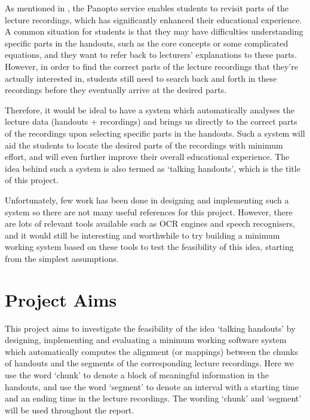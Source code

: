 As mentioned in , the Panopto service enables students to revisit parts of the lecture recordings, which has significantly enhanced their educational experience. A common situation for students is that they may have difficulties understanding specific parts in the handouts, such as the core concepts or some complicated equations, and they want to refer back to lecturers' explanations to these parts. However, in order to find the correct parts of the lecture recordings that they're actually interested in, students still need to search back and forth in these recordings before they eventually arrive at the desired parts.

Therefore, it would be ideal to have a system which automatically analyses the lecture data (handouts + recordings) and brings us directly to the correct parts of the recordings upon selecting specific parts in the handouts. Such a system will aid the students to locate the desired parts of the recordings with minimum effort, and will even further improve their overall educational experience. The idea behind such a system is also termed as `talking handouts', which is the title of this project.

Unfortunately, few work has been done in designing and implementing such a system so there are not many useful references for this project. However, there are lots of relevant tools available such as OCR engines and speech recognisers, and it would still be interesting and worthwhile to try building a minimum working system based on these tools to test the feasibility of this idea, starting from the simplest assumptions.


\section{Project Aims}
\label{sec:intro-aims}

This project aims to investigate the feasibility of the idea `talking handouts' by designing, implementing and evaluating a minimum working software system which automatically computes the alignment (or mappings) between the chunks of handouts and the segments of the corresponding lecture recordings. Here we use the word `chunk' to denote a block of meaningful information in the handouts, and use the word `segment' to denote an interval with a starting time and an ending time in the lecture recordings. The wording `chunk' and `segment' will be used throughout the report.

